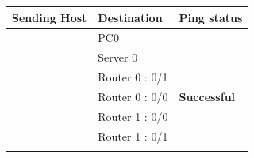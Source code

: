 \documentclass[a4paper,11pt]{article}
\begin{document}
\begin{enumerate}
\begin{table}[H]
              \begin{tabular}{| m{9em}| m{12em}| m{9em} |}
                  \hline
                  {\cellcolor[rgb]{0.333,0.686,1}}\textbf{Sending Host}           & \textbf{Destination} & \textbf{Ping status}                                                   \\
                  \hline
                  {\cellcolor[rgb]{0.333,0.686,1}}                                & PC0                  & {\cellcolor[rgb]{0.376,1,0.882}}                                       \\
                  \hhline{|>{\arrayrulecolor[rgb]{0.333,0.686,1}}->{\arrayrulecolor{black}}->{\arrayrulecolor[rgb]{0.376,1,0.882}}->{\arrayrulecolor{black}}|}
                  {\cellcolor[rgb]{0.333,0.686,1}}                                & Server 0             & {\cellcolor[rgb]{0.376,1,0.882}}                                       \\
                  \hhline{|>{\arrayrulecolor[rgb]{0.333,0.686,1}}->{\arrayrulecolor{black}}->{\arrayrulecolor[rgb]{0.376,1,0.882}}->{\arrayrulecolor{black}}|}
                  {\cellcolor[rgb]{0.333,0.686,1}}                                & Router 0 : 0/1       & {\cellcolor[rgb]{0.376,1,0.882}}                                       \\
                  \hhline{|>{\arrayrulecolor[rgb]{0.333,0.686,1}}->{\arrayrulecolor{black}}->{\arrayrulecolor[rgb]{0.376,1,0.882}}->{\arrayrulecolor{black}}|}
                  {\cellcolor[rgb]{0.333,0.686,1}}                                & Router 0 : 0/0       & \multirow{-4}{*}{{\cellcolor[rgb]{0.376,1,0.882}}\textbf{ Successful}} \\
                  \hhline{|>{\arrayrulecolor[rgb]{0.333,0.686,1}}->{\arrayrulecolor{black}}--|}
                  {\cellcolor[rgb]{0.333,0.686,1}}                                & Router 1 : 0/0       & {\cellcolor[rgb]{1,0.173,0.09}}                                        \\
                  \hhline{|>{\arrayrulecolor[rgb]{0.333,0.686,1}}->{\arrayrulecolor{black}}->{\arrayrulecolor[rgb]{1,0.173,0.09}}->{\arrayrulecolor{black}}|}
                  {\cellcolor[rgb]{0.333,0.686,1}}                                & Router 1 : 0/1       & {\cellcolor[rgb]{1,0.173,0.09}}                                        \\
                  \hhline{|>{\arrayrulecolor[rgb]{0.333,0.686,1}}->{\arrayrulecolor{black}}->{\arrayrulecolor[rgb]{1,0.173,0.09}}->{\arrayrulecolor{black}}|}

\end{tabular}
\end{table}
\end{enumerate}
\end{document}
